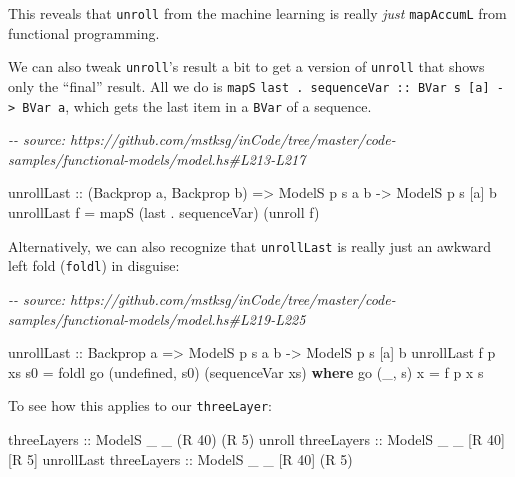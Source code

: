 \documentclass[]{article}
\newenvironment{Shaded}{}{}
\newcommand{\CommentTok}[1]{\textcolor[rgb]{0.38,0.63,0.69}{\textit{#1}}}
\newcommand{\DataTypeTok}[1]{\textcolor[rgb]{0.56,0.13,0.00}{#1}}
\newcommand{\DecValTok}[1]{\textcolor[rgb]{0.25,0.63,0.44}{#1}}
\newcommand{\FunctionTok}[1]{\textcolor[rgb]{0.02,0.16,0.49}{#1}}
\newcommand{\KeywordTok}[1]{\textcolor[rgb]{0.00,0.44,0.13}{\textbf{#1}}}
\newcommand{\NormalTok}[1]{#1}
\newcommand{\OperatorTok}[1]{\textcolor[rgb]{0.40,0.40,0.40}{#1}}
\newcommand{\OtherTok}[1]{\textcolor[rgb]{0.00,0.44,0.13}{#1}}
\begin{document}
This reveals that \texttt{unroll} from the machine learning is really
\emph{just} \texttt{mapAccumL} from functional programming.

We can also tweak \texttt{unroll}'s result a bit to get a version of
\texttt{unroll} that shows only the ``final'' result. All we do is \texttt{mapS}
\texttt{last\ .\ sequenceVar\ ::\ BVar\ s\ {[}a{]}\ -\textgreater{}\ BVar\ a},
which gets the last item in a \texttt{BVar} of a sequence.

\begin{Shaded}
\begin{Highlighting}[]
\CommentTok{{-}{-} source: https://github.com/mstksg/inCode/tree/master/code{-}samples/functional{-}models/model.hs\#L213{-}L217}

\NormalTok{unrollLast}
\OtherTok{    ::}\NormalTok{ (}\DataTypeTok{Backprop}\NormalTok{ a, }\DataTypeTok{Backprop}\NormalTok{ b)}
    \OtherTok{=>} \DataTypeTok{ModelS}\NormalTok{ p s  a  b}
    \OtherTok{{-}>} \DataTypeTok{ModelS}\NormalTok{ p s [a] b}
\NormalTok{unrollLast f }\OtherTok{=}\NormalTok{ mapS (}\FunctionTok{last} \OperatorTok{.}\NormalTok{ sequenceVar) (unroll f)}
\end{Highlighting}
\end{Shaded}

Alternatively, we can also recognize that \texttt{unrollLast} is really just an
awkward left fold (\texttt{foldl}) in disguise:

\begin{Shaded}
\begin{Highlighting}[]
\CommentTok{{-}{-} source: https://github.com/mstksg/inCode/tree/master/code{-}samples/functional{-}models/model.hs\#L219{-}L225}

\NormalTok{unrollLast\textquotesingle{}}
\OtherTok{    ::} \DataTypeTok{Backprop}\NormalTok{ a}
    \OtherTok{=>} \DataTypeTok{ModelS}\NormalTok{ p s  a  b}
    \OtherTok{{-}>} \DataTypeTok{ModelS}\NormalTok{ p s [a] b}
\NormalTok{unrollLast\textquotesingle{} f p xs s0 }\OtherTok{=}\NormalTok{ foldl\textquotesingle{} go (}\FunctionTok{undefined}\NormalTok{, s0) (sequenceVar xs)}
  \KeywordTok{where}
\NormalTok{    go (\_, s) x }\OtherTok{=}\NormalTok{ f p x s}
\end{Highlighting}
\end{Shaded}

To see how this applies to our \texttt{threeLayer}:

\begin{Shaded}
\begin{Highlighting}[]
\OtherTok{threeLayers            ::} \DataTypeTok{ModelS}\NormalTok{ \_ \_ (}\DataTypeTok{R} \DecValTok{40}\NormalTok{) (}\DataTypeTok{R} \DecValTok{5}\NormalTok{)}
\NormalTok{unroll}\OtherTok{     threeLayers ::} \DataTypeTok{ModelS}\NormalTok{ \_ \_ [}\DataTypeTok{R} \DecValTok{40}\NormalTok{] [}\DataTypeTok{R} \DecValTok{5}\NormalTok{]}
\NormalTok{unrollLast}\OtherTok{ threeLayers ::} \DataTypeTok{ModelS}\NormalTok{ \_ \_ [}\DataTypeTok{R} \DecValTok{40}\NormalTok{] (}\DataTypeTok{R} \DecValTok{5}\NormalTok{)}
\end{Highlighting}
\end{Shaded}
\end{document}
